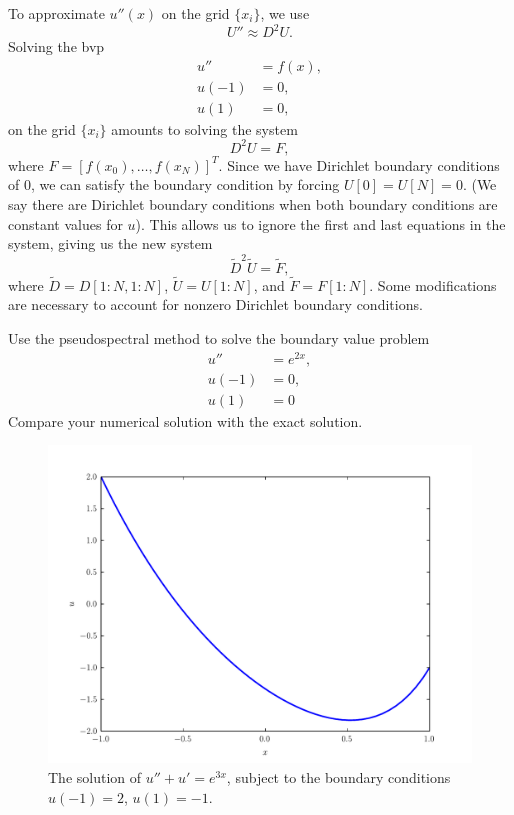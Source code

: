 To approximate $u''(x)$ on the grid $\{x_i\}$, we use 
\[U'' \approx D^2 U.\]
Solving the bvp
\begin{align*}
u'' &= f(x), \\
u(-1) &= 0, \\
u(1) &= 0,
\end{align*}
on the grid $\{x_i\}$ amounts to solving the system 
\[D^2 U = F,\]
where $F = [f(x_0),\ldots, f(x_N)]^T$.
Since we have Dirichlet boundary conditions of $0$, we can satisfy the boundary condition by forcing $U[0] = U[N] = 0$.
(We say there are Dirichlet boundary conditions when both boundary conditions are constant values for $u$).
This allows us to ignore the first and last equations in the system, giving us the new system 
\[\tilde{D}^2 \tilde{U} = \tilde{F},\]
where $\tilde{D} = D[1:N,1:N]$, $\tilde{U} = U[1:N]$, and $\tilde{F} = F[1:N]$.
Some modifications are necessary to account for nonzero Dirichlet boundary conditions.

\begin{problem}
Use the pseudospectral method to solve the boundary value problem 
\begin{align*}
u'' &= e^{2x}, \\
u(-1) &= 0, \\
u(1) &= 0
\end{align*}
Compare your numerical solution with the exact solution.
\end{problem}

\begin{figure}
\centering
\includegraphics[width=\textwidth]{nonzeroDirichlet.pdf}
\caption{The solution of $u'' + u' = e^{3x}$, subject to the boundary conditions 
$u(-1) = 2$, $u(1) = -1$.}
\label{fig:nonzeroDirichlet}
\end{figure}


